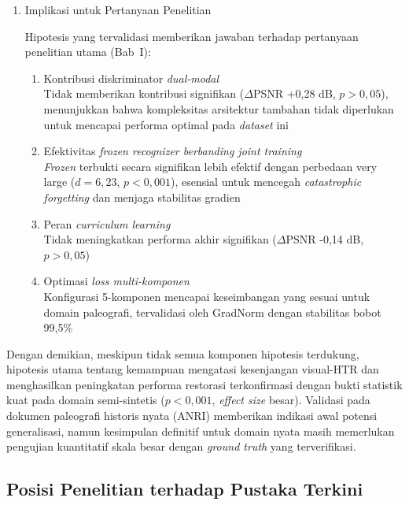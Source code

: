 \documentclass[12pt,a4paper]{article}
\begin{document}
\begin{enumerate}[leftmargin=1.5em, labelsep=0.5em, itemindent=0pt, label=\arabic*., topsep=0pt, partopsep=0pt]
    \item Implikasi untuk Pertanyaan Penelitian
    
    Hipotesis yang tervalidasi memberikan jawaban terhadap pertanyaan penelitian utama (Bab~I):

    \begin{enumerate}[leftmargin=1.5em, labelsep=0.5em, itemindent=0pt, noitemsep, topsep=0pt, label=\alph*)]
        \item Kontribusi diskriminator \textit{dual-modal} \\
              Tidak memberikan kontribusi signifikan ($\Delta$PSNR +0,28 dB, $p>0,05$), menunjukkan bahwa kompleksitas arsitektur tambahan tidak diperlukan untuk mencapai performa optimal pada \textit{dataset} ini
        \item Efektivitas \textit{frozen recognizer berbanding \textit{joint training}} \\
              \textit{Frozen} terbukti secara signifikan lebih efektif dengan perbedaan very large ($d=6,23$, $p<0,001$), esensial untuk mencegah \textit{catastrophic forgetting} dan menjaga stabilitas gradien
        \item Peran \textit{curriculum learning} \\
              Tidak meningkatkan performa akhir signifikan ($\Delta$PSNR -0,14 dB, $p>0,05$)
        \item Optimasi \textit{loss multi-komponen} \\
              Konfigurasi 5-komponen mencapai keseimbangan yang sesuai untuk domain paleografi, tervalidasi oleh GradNorm dengan stabilitas bobot 99,5\%
    \end{enumerate}
\end{enumerate}

Dengan demikian, meskipun tidak semua komponen hipotesis terdukung, hipotesis utama tentang kemampuan mengatasi kesenjangan visual-HTR dan menghasilkan peningkatan performa restorasi terkonfirmasi dengan bukti statistik kuat pada domain semi-sintetis ($p<0,001$, \textit{effect size} besar). Validasi pada dokumen paleografi historis nyata (ANRI) memberikan indikasi awal potensi generalisasi, namun kesimpulan definitif untuk domain nyata masih memerlukan pengujian kuantitatif skala besar dengan \textit{ground truth} yang terverifikasi.


\subsection{Posisi Penelitian terhadap Pustaka Terkini}
\label{subsec:perbandingan-literatur}
\end{document}

